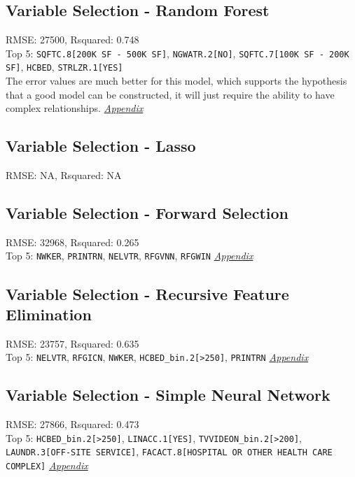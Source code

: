 \subsection{Variable Selection - Random Forest}
RMSE: 27500, Rsquared: 0.748\\
Top 5: \lstinline{SQFTC.8[200K SF - 500K SF]}, \lstinline{NGWATR.2[NO]}, \lstinline{SQFTC.7[100K SF - 200K SF]}, \lstinline{HCBED}, \lstinline{STRLZR.1[YES]} 
\\[0.1in]
The error values are much better for this model, which supports the hypothesis that a good model can be constructed, it will just require the ability to have complex relationships.  \textit{\hyperref[appendix:natural_gas:rf]{Appendix}}

\subsection{Variable Selection - Lasso}
RMSE: NA, Rsquared: NA\\

\subsection{Variable Selection - Forward Selection}
RMSE: 32968, Rsquared: 0.265\\
Top 5: \lstinline{NWKER}, \lstinline{PRINTRN}, \lstinline{NELVTR}, \lstinline{RFGVNN}, \lstinline{RFGWIN}  \textit{\hyperref[appendix:natural_gas:lp]{Appendix}}

\subsection{Variable Selection - Recursive Feature Elimination}
RMSE: 23757, Rsquared: 0.635\\
Top 5: \lstinline{NELVTR}, \lstinline{RFGICN}, \lstinline{NWKER}, \lstinline{HCBED_bin.2[>250]}, \lstinline{PRINTRN}  \textit{\hyperref[appendix:natural_gas:rfe]{Appendix}}

\subsection{Variable Selection - Simple Neural Network}
RMSE: 27866, Rsquared: 0.473\\
Top 5: \lstinline{HCBED_bin.2[>250]}, \lstinline{LINACC.1[YES]}, \lstinline{TVVIDEON_bin.2[>200]}, \lstinline{LAUNDR.3[OFF-SITE SERVICE]}, \lstinline{FACACT.8[HOSPITAL OR OTHER HEALTH CARE COMPLEX]}  
\textit{\hyperref[appendix:natural_gas:snn]{Appendix}}
\newpage
